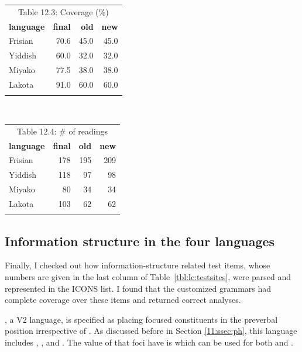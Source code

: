 \begin{table}[!t]
\small
\centering
\begin{tabular}{lrrr}
\multicolumn{4}{c}{Table 12.3: Coverage (\%)}\\
\lsptoprule
\textbf{language} & \textbf{final} & \textbf{old}  & \textbf{new} \\ \hline
\midrule
Frisian  & 70.6 &  45.0 &  45.0 \\
Yiddish  & 60.0 &  32.0 &  32.0 \\
Miyako  & 77.5 &  38.0 &  38.0 \\
Lakota  & 91.0 &  60.0 &  60.0 \\
\lspbottomrule
\end{tabular}
\mbox{ }  \mbox{ } \mbox{ }  \mbox{ } \mbox{ }  
\begin{tabular}{lrrr}
\multicolumn{4}{c}{Table 12.4: \# of readings}\\
\lsptoprule
\textbf{language} & \textbf{final} & \textbf{old}  & \textbf{new} \\ \hline
\midrule
Frisian  & 178 &  195 &  209 \\
Yiddish  & 118 &  97 &  98 \\
Miyako  & 80 &  34 &  34 \\
Lakota  & 103 & 62 &  62 \\
\lspbottomrule
\end{tabular}
\end{table}



\subsection{Information structure in the four languages}
\label{12:ssec:lc-info}


Finally, I checked out how information-structure related test items,
whose numbers are given in the last column of
Table~\ref{tbl:lc:testsites}, were parsed and represented in the ICONS
list.  I found that the customized grammars had complete
coverage over these items and returned correct analyses.



, a V2 language, is specified as placing focused constituents
in the preverbal position irrespective of .  As
discussed before in Section \ref{11:ssec:ph}, this language includes
, , and
. The value of  that
 foci have is  which can be used for both
 and .

